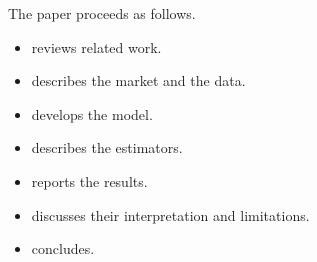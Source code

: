 The paper proceeds as follows.
\begin{itemize}
  \item {} reviews related work.
  \item {} describes the market and the data.
  \item {} develops the model.
  \item {} describes the estimators.
  \item {} reports the results.
  \item {} discusses their interpretation and limitations.
  \item {} concludes.
\end{itemize}
